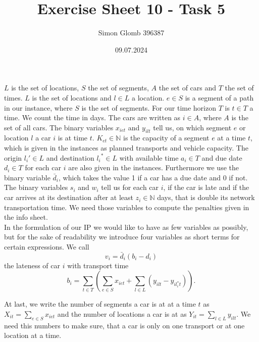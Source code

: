 \documentclass[a4paper]{article}
\begin{document}
\title{Exercise Sheet 10 - Task 5}
\author{Simon Glomb 396387}
\date{09.07.2024}

\maketitle


$L$ is the set of locations, $S$ the set of segments, $A$ the set of cars and $T$ the set of times. 
$L$ is the set of locations and $l\in L$ a location. $e\in S$ is a segment of a path in our instance, where $S$ is the set of segments. For our time horizon $T$ is $t\in T$ a time. We count the time in days. The cars are written as $i\in A$, where $A$ is the set of all cars. 
The binary variables $x_{iet}$ and $y_{ilt}$ tell us, on which segment $e$ or location $l$ a car $i$ is at time $t$. $K_{et}\in\mathbb{N}$ is the capacity of a segment $e$ at a time $t$, which is given in the instances as planned transports and vehicle capacity. The origin ${l_i}'\in L$ and destination ${l_i}^*\in L$ with available time $a_i\in T$ and due date $d_i\in T$ for each car $i$ are also given in the instances. Furthermore we use the binary variable $\bar d_i$, which takes the value 1 if a car has a due date and 0 if not. The binary variables $s_i$ and $w_i$ tell us for each car $i$, if the car is late and if the car arrives at its destination after at least $z_i\in \mathbb{N}$ days, that is double its network transportation time. We need those variables to compute the penalties given in the info sheet.  \\
In the formulation of our IP we would like to have as few variables as possibly, but for the sake of readability we introduce four variables as short terms for certain expressions. We call
\begin{equation}
   v_i = \bar d_i(b_i - d_i)
\end{equation}
the lateness of car $i$ with transport time 
\begin{equation}
   b_i = \sum_{t\in T}(\sum_{e\in S} x_{iet} + \sum_{l\in L}(y_{ilt} - y_{il_i^*t})).
\end{equation}

At last, we write the number of segments a car is at at a time $t$ as $X_{it} = \sum_{e\in S} x_{iet}$ and the number of locations a car is at as $Y_{it} = \sum_{l\in L} y_{ilt}$. We need this numbers to make sure, that a car is only on one transport or at one location at a time.\\
\end{document}
